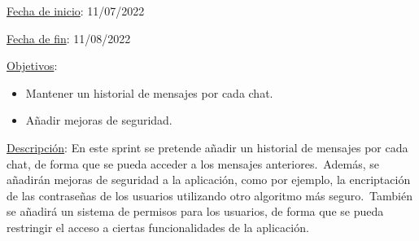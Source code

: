 
\underline{Fecha de inicio}: 11/07/2022

\underline{Fecha de fin}: 11/08/2022

\underline{Objetivos}:
\begin{itemize}
	\item Mantener un historial de mensajes por cada chat.
	\item Añadir mejoras de seguridad.
\end{itemize}

\underline{Descripción}:
En este sprint se pretende añadir un historial de mensajes por cada chat, de forma que se pueda acceder a los
mensajes anteriores.\ Además, se añadirán mejoras de seguridad a la aplicación, como por ejemplo, la
encriptación de las contraseñas de los usuarios utilizando otro algoritmo más seguro.\ También se añadirá un sistema
de permisos para los usuarios, de forma que se pueda restringir el acceso a ciertas funcionalidades de la aplicación.
